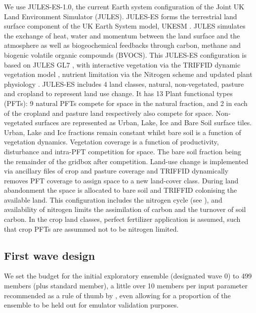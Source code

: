 \documentclass[gmd, manuscript]{copernicus}
\begin{document}
We use JULES-ES-1.0, the current Earth system configuration of the Joint UK Land Environment Simulator (JULES). JULES-ES forms the terrestrial land surface component of the UK Earth System model, UKESM \citep{sellar2019UKESM}. JULES simulates the exchange of heat, water and momentum between the land surface and the atmosphere as well as biogeochemical feedbacks through carbon, methane and biogenic volatile organic compounds (BVOCS). This JULES-ES configuration is based on JULES GL7 \citep{wiltshire2020jules}, with interactive vegetation via the TRIFFID dynamic vegetation model \citep{cox2001description}, nutrient limitation via the Nitrogen scheme \citep{wiltshire2021julescn} and updated plant physiology \citep{harper2018vegetation}. JULES-ES includes 4 land classes, natural, non-vegetated, pasture and cropland to represent land use change. It has 13 Plant functional types (PFTs): 9 natural PFTs compete for space in the natural fraction, and 2 in each of the cropland and pasture land respectively also compete for space. Non-vegetated surfaces are represented as Urban, Lake, Ice and Bare Soil surface tiles. Urban, Lake and Ice fractions remain constant whilst bare soil is a function of vegetation dynamics. Vegetation coverage is a function of productivity, disturbance and intra-PFT competition for space. The bare soil fraction being the remainder of the gridbox after competition. Land-use change is implemented via ancillary files of crop and pasture coverage and TRIFFID dynamically removes PFT coverage to assign space to a new land-cover class. During land abandonment the space is allocated to bare soil and TRIFFID colonising the available land.  This configuration includes the nitrogen cycle (see \citep{wiltshire2021julescn}), and availability of nitrogen limits the assimilation of carbon and the turnover of soil carbon. In the crop land classes, perfect fertilizer application is assumed, such that crop PFTs are assummed not to be nitrogen limited.

\subsection{First wave design}\label{ssec:first_wave_design}

We set the budget for the initial exploratory ensemble (designated wave 0) to 499 members (plus standard member), a little over 10 members per input parameter recommended as a rule of thumb by \cite{loeppky2012choosing}, even allowing for a proportion of the ensemble to be held out for emulator validation purposes.
\end{document}
